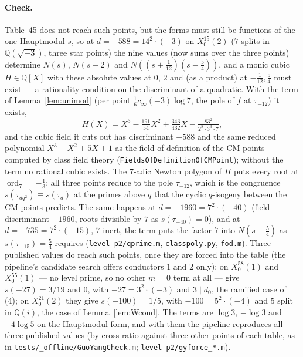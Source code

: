 \documentclass[11pt,reqno]{amsart}
\theoremstyle{plain}
\theoremstyle{definition}
\DeclareMathOperator{\ord}{ord}
\newcommand{\Q}{\mathbb{Q}}
\begin{document}
\paragraph{Check.} Table~45 does not reach such points, but the forms must still be functions of
the one Hauptmodul $s$, so at $d=-588=14^2\cdot(-3)$ on $X_0^{15}(2)$ ($7$ splits in $\Q(\sqrt{-3})$,
three star points) the nine values (now sums over the three points) determine $N(s)$, $N(s-2)$ and
$N((s+\tfrac1{12})(s-\tfrac54))$, and a monic cubic $H\in\Q[X]$ with these absolute values at $0$,
$2$ and (as a product) at $-\tfrac1{12},\tfrac54$ must exist --- a rationality condition on the
discriminant of a quadratic. With the term of Lemma~\ref{lem:unimod} (per point
$\tfrac16c_\infty(-3)\log7$, the pole of $f$ at $\tau_{-12}$) it exists,
\[
  H(X)=X^3-\tfrac{191}{54}X^2+\tfrac{343}{432}X-\tfrac{83^2}{2^8\cdot3^3\cdot7},
\]
and the cubic field it cuts out has discriminant $-588$ and the same reduced polynomial
$X^3-X^2+5X+1$ as the field of definition of the CM points computed by class field theory
(\texttt{FieldsOfDefinitionOfCMPoint}); without the term no rational cubic exists. The $7$-adic
Newton polygon of $H$ puts every root at $\ord_7=-\tfrac13$: all three points reduce to the pole
$\tau_{-12}$, which is the congruence $s(\tau_{dq^2})\equiv s(\tau_d)$ at the primes above $q$ that
the cyclic $q$-isogeny between the CM points predicts. The same happens at $d=-1960=7^2\cdot(-40)$
(field discriminant $-1960$, roots divisible by $7$ as $s(\tau_{-40})=0$), and at $d=-735=7^2\cdot
(-15)$, $7$ inert, the term puts the factor $7$ into $N(s-\tfrac54)$ as $s(\tau_{-15})=\tfrac54$
requires (\texttt{level-p2/qprime.m}, \texttt{classpoly.py}, \texttt{fod.m}). Three published values do
reach such points, once they are forced into the table (the pipeline's candidate search offers
conductors $1$ and $2$ only): on $X_0^{58}(1)$ and $X_0^{55}(1)$ --- no level prime, so no other
$m=0$ term at all --- \cite{GY} give $s(-27)=3/19$ and $0$, with $-27=3^2\cdot(-3)$ and $3\mid
d_0$, the ramified case of (4); on $X_0^{21}(2)$ they give $s(-100)=1/5$, with $-100=5^2\cdot(-4)$
and $5$ split in $\Q(i)$, the case of Lemma~\ref{lem:Wcond}. The terms are $\log3$, $-\log3$ and
$-4\log5$ on the Hauptmodul form, and with them the pipeline reproduces all three published values
(by cross-ratio against three other points of each table, as in
\texttt{tests/\_offline/GuoYangCheck.m}; \texttt{level-p2/gyforce\_*.m}). 
\end{document}
